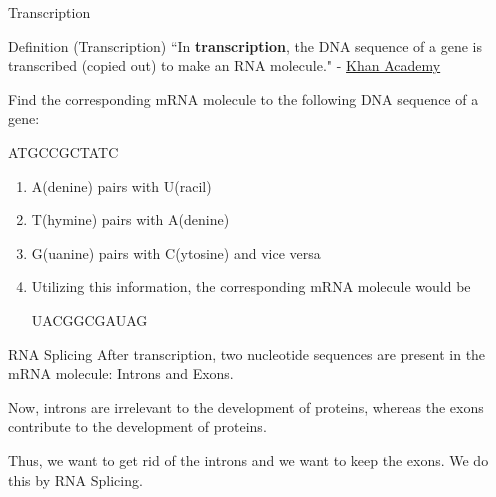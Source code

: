 \documentclass{beamer}
\begin{document}
\begin{frame}{Transcription}
\begin{alertblock}{Definition (Transcription)}
``In \textbf{transcription}, the DNA sequence of a gene is transcribed (copied out) to make an RNA molecule." - \href{https://www.khanacademy.org/science/ap-biology/gene-expression-and-regulation/transcription-and-rna-processing/a/overview-of-transcription}{Khan Academy}
\end{alertblock}

\begin{example}
Find the corresponding mRNA molecule to the following DNA sequence of a gene:
\begin{center}
    ATGCCGCTATC
\end{center}
\end{example}
\begin{enumerate}
    \item<1-> A(denine) pairs with U(racil)
    \item<2-> T(hymine) pairs with A(denine)
    \item<3-> G(uanine) pairs with C(ytosine) and vice versa
    \item<4-> Utilizing this information, the corresponding mRNA molecule would  be
    \begin{center}
        UACGGCGAUAG
    \end{center}
\end{enumerate}

\end{frame}

\begin{frame}{RNA Splicing}
After transcription, two nucleotide sequences are present in the mRNA molecule: Introns and Exons.

\bigskip Now, introns are irrelevant to the development of proteins, whereas the exons contribute to the development of proteins.

\bigskip Thus, we want to get rid of the introns and we want to keep the exons. We do this by RNA Splicing.
\end{frame}
\end{document}
